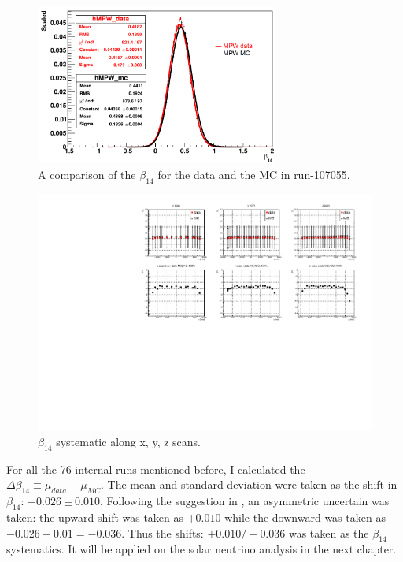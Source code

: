 \begin{figure}[htbp]
	\centering
	\includegraphics[width=8cm]{N16FitMPW_beta14_107055.png}
	\caption{A comparison of the $\beta_{14}$ for the data and the MC in run-107055.}
	\label{N16beta14MPW}
\end{figure}

\begin{figure}[htbp]
	\centering
	\includegraphics[width=15cm]{beta14_XYZScans.pdf}
	\caption{$\beta_{14}$ systematic along x, y, z scans.}
	\label{beta14_XYZscans}
\end{figure}

For all the 76 internal runs mentioned before, I calculated the $\Delta \beta_{14}\equiv\mu_{data}-\mu_{MC}$. The mean and standard deviation were taken as the shift in $\beta_{14}$: $-0.026\pm0.010$. Following the suggestion in \cite{waterunidoc}, an asymmetric uncertain was taken: the upward shift was taken as $+0.010$ while the downward was taken as $-0.026-0.01=-0.036$. Thus the shifts: $+0.010/-0.036$ was taken as the $\beta_{14}$ systematics. It will be applied on the solar neutrino analysis in the next chapter. 


